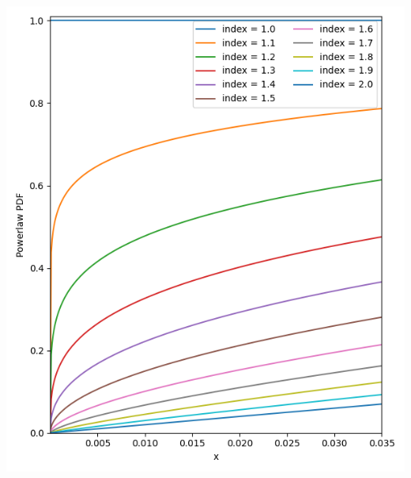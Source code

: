 \begin{minipage}[l]{0.48\textwidth}
    \centering
    \includegraphics[width=\textwidth]{images/powerlaw}
    \label{fig:pl_distribution}
\end{minipage}
\hfill
